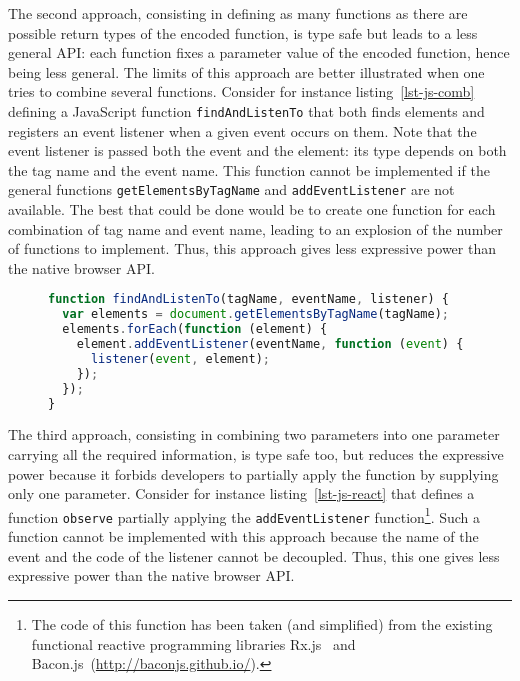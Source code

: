 \documentclass{llncs}
\newcommand{\jscode}[1]{\lstinline[language=JavaScript]|#1|}
\begin{document}
The second approach, consisting in defining as many functions as there are possible return types of the encoded function, is type safe but leads to a less general API: each function fixes a parameter value of the encoded function, hence being less general. The limits of this approach are better illustrated when one tries to combine several functions. Consider for instance listing~\ref{lst-js-comb} defining a JavaScript function \jscode{findAndListenTo} that both finds elements and registers an event listener when a given event occurs on them. Note that the event listener is passed both the event and the element: its type depends on both the tag name and the event name. This function cannot be implemented if the general functions \jscode{getElementsByTagName} and \jscode{addEventListener} are not available. The best that could be done would be to create one function for each combination of tag name and event name, leading to an explosion of the number of functions to implement. Thus, this approach gives less 
expressive power than the native browser API.

\begin{figure}
\begin{lstlisting}[label=lst-js-comb,language=JavaScript,caption={Combination of use of \jscode{getElementsByTagName} and \jscode{addEventListener}}]
function findAndListenTo(tagName, eventName, listener) {
  var elements = document.getElementsByTagName(tagName);
  elements.forEach(function (element) {
    element.addEventListener(eventName, function (event) {
      listener(event, element);
    });
  });
}
\end{lstlisting}
\end{figure}

The third approach, consisting in combining two parameters into one parameter carrying all the required information, is type safe too, but reduces the expressive power because it forbids developers to partially apply the function by supplying only one parameter. Consider for instance listing~\ref{lst-js-react} that defines a function \jscode{observe} partially applying the \jscode{addEventListener} function\footnote{The code of this function has been taken (and simplified) from the existing functional reactive programming libraries Rx.js~\cite{liberty2011reactive} and Bacon.js~(\href{http://baconjs.github.io/}{http://baconjs.github.io/}).}. Such a function cannot be implemented with this approach because the name of the event and the code of the listener cannot be decoupled. Thus, this one gives less expressive power than the native browser API.
\end{document}
